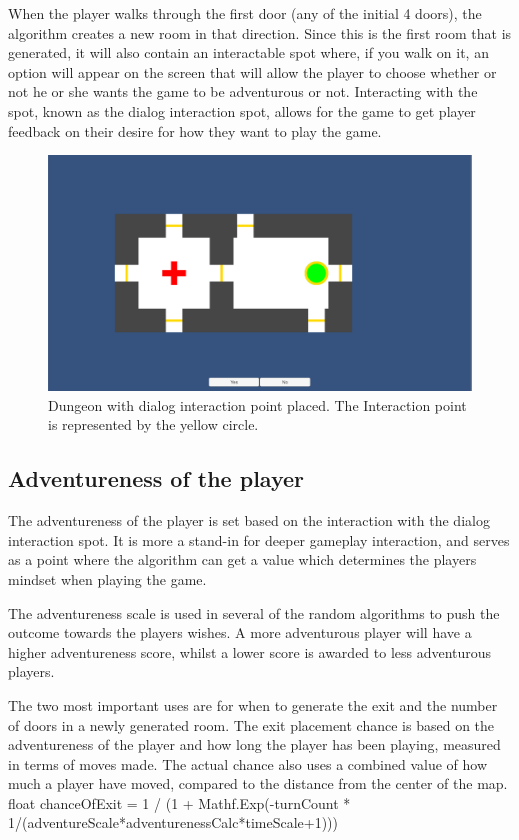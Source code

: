 \documentclass[conference,compsoc]{IEEEtran}
\begin{document}
When the player walks through the first door (any of the initial 4 doors), the algorithm creates a new room in that direction. 
Since this is the first room that is generated, it will also contain an interactable spot where, if you walk on it, an option will appear on the screen that will allow the player to choose whether or not he or she wants the game to be adventurous or not. Interacting with the spot, known as the dialog interaction spot, allows for the game to get player feedback on their desire for how they want to play the game.

\begin{figure}[h]
	\graphicspath{{figures/}}
	\includegraphics[width = \columnwidth ]{DialogSet.png}
	\caption{Dungeon with dialog interaction point placed. The Interaction point is represented by the yellow circle.}
	\label{fig:dialogset}
\end{figure}
\subsection{Adventureness of the player}
The adventureness of the player is set based on the interaction with the dialog interaction spot. It is more a stand-in for deeper gameplay interaction, and serves as a point where the algorithm can get a value which determines the players mindset when playing the game. 

The adventureness scale is used in several of the random algorithms to push the outcome towards the players wishes. A more adventurous player will have a higher adventureness score, whilst a lower score is awarded to less adventurous players.

The two most important uses are for when to generate the exit and the number of doors in a newly generated room. 
The exit placement chance is based on the adventureness of the player and how long the player has been playing, measured in terms of moves made.
The actual chance also uses a combined value of how much a player have moved, compared to the distance from the center of the map.
float chanceOfExit = 1 / (1 + Mathf.Exp(-turnCount * 1/(adventureScale*adventurenessCalc*timeScale+1))) 
\end{document}
